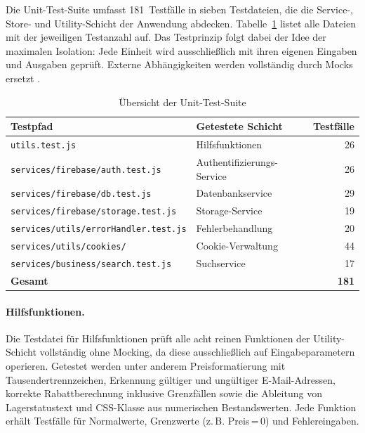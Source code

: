 Die Unit-Test-Suite umfasst 181~Testfälle in sieben Testdateien, die die Service-, Store- und Utility-Schicht der Anwendung abdecken. Tabelle~\ref{tab:unit-tests} listet alle Dateien mit der jeweiligen Testanzahl auf. Das Testprinzip folgt dabei der Idee der maximalen Isolation: Jede Einheit wird ausschließlich mit ihren eigenen Eingaben und Ausgaben geprüft. Externe Abhängigkeiten werden vollständig durch Mocks ersetzt \cite{osherove2024}.

\begin{table}[H]
\centering
\begin{tabular}{llr}
\toprule
\textbf{Testpfad} & \textbf{Getestete Schicht} & \textbf{Testfälle} \\
\midrule
\texttt{utils.test.js}                       & Hilfsfunktionen             & 26 \\
\texttt{services/firebase/auth.test.js}      & Authentifizierungs-Service  & 26 \\
\texttt{services/firebase/db.test.js}        & Datenbankservice            & 29 \\
\texttt{services/firebase/storage.test.js}   & Storage-Service             & 19 \\
\texttt{services/utils/errorHandler.test.js} & Fehlerbehandlung            & 20 \\
\texttt{services/utils/cookies/}             & Cookie-Verwaltung           & 44 \\
\texttt{services/business/search.test.js}    & Suchservice                 & 17 \\
\midrule
\textbf{Gesamt}                              &                             & \textbf{181} \\
\bottomrule
\end{tabular}
\caption{Übersicht der Unit-Test-Suite}
\label{tab:unit-tests}
\end{table}

\paragraph{Hilfsfunktionen.} Die Testdatei für Hilfsfunktionen prüft alle acht reinen Funktionen der Utility-Schicht vollständig ohne Mocking, da diese ausschließlich auf Eingabeparametern operieren. Getestet werden unter anderem Preisformatierung mit Tausendertrennzeichen, Erkennung gültiger und ungültiger E-Mail-Adressen, korrekte Rabattberechnung inklusive Grenzfällen sowie die Ableitung von Lagerstatustext und CSS-Klasse aus numerischen Bestandswerten. Jede Funktion erhält Testfälle für Normalwerte, Grenzwerte (z.\,B. Preis\,=\,0) und Fehlereingaben.

